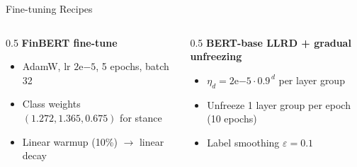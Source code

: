 \documentclass[10pt, aspectratio=169]{beamer}
\begin{document}
\begin{frame}{Fine-tuning Recipes}
    \begin{columns}[T]
        \begin{column}{0.5\textwidth}
            \textbf{FinBERT fine-tune}
            \begin{itemize}\setlength{\itemsep}{0pt}
                \item AdamW, lr $2\mathrm{e}{-5}$, 5 epochs, batch 32
                \item Class weights $(1.272, 1.365, 0.675)$ for stance
                \item Linear warmup (10\%) $\rightarrow$ linear decay
            \end{itemize}
        \end{column}
        \begin{column}{0.5\textwidth}
            \textbf{BERT-base LLRD + gradual unfreezing}~\cite{howard2018ulmfit,sun2019finetune}
            \begin{itemize}\setlength{\itemsep}{0pt}
                \item $\eta_d = 2\mathrm{e}{-5} \cdot 0.9^{\,d}$ per layer group
                \item Unfreeze 1 layer group per epoch (10 epochs)
                \item Label smoothing $\varepsilon = 0.1$
            \end{itemize}
        \end{column}
    \end{columns}
\end{frame}
\end{document}
